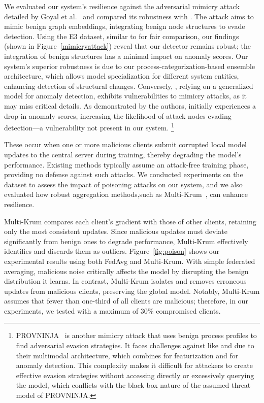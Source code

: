   We evaluated our system's resilience against the adversarial mimicry attack detailed by Goyal et al.~\cite{goyal2023sometimes} and compared its robustness with \flash. The attack aims to mimic benign graph embeddings, integrating benign node structures to evade detection. Using the E3 dataset, similar to \flash for fair comparison, our findings (shown in Figure~\ref{mimicryattack}) reveal that our detector remains robust; the integration of benign structures has a minimal impact on anomaly scores. Our system's superior robustness is due to our process-categorization-based ensemble \gnnshort architecture, which allows model specialization for different system entities, enhancing detection of structural changes. Conversely, \flash, relying on a generalized model for anomaly detection, exhibits vulnerabilities to mimicry attacks, as it may miss critical details. As demonstrated by the authors, \flash initially experiences a drop in anomaly scores, increasing the likelihood of attack nodes evading detection—a vulnerability not present in our system. \footnote{PROVNINJA~\cite{mukherjee2023evading} is another mimicry attack that uses benign process profiles to find adversarial evasion strategies. It faces challenges against \pids like \flash and \Sys due to their multimodal architecture, which combines \wordvec for featurization and \gnnshort for anomaly detection. This complexity makes it difficult for attackers to create effective evasion strategies without accessing \wordvec directly or excessively querying the model, which conflicts with the black box nature of the assumed threat model of PROVNINJA.}


 These occur when one or more malicious clients submit corrupted local model updates to the central server during training, thereby degrading the model’s performance. Existing methods typically assume an attack-free training phase, providing no defense against such attacks. We conducted experiments on the \optc dataset to assess the impact of poisoning attacks on our system, and we also evaluated how robust aggregation methods,such as Multi-Krum~\cite{munoz2019byzantine}, can enhance resilience.

Multi-Krum compares each client’s gradient with those of other clients, retaining only the most consistent updates. Since malicious updates must deviate significantly from benign ones to degrade performance, Multi-Krum effectively identifies and discards them as outliers. Figure~\ref{fig:poison} shows our experimental results using both FedAvg and Multi-Krum. With simple federated averaging, malicious noise critically affects the model by disrupting the benign distribution it learns. In contrast, Multi-Krum isolates and removes erroneous updates from malicious clients, preserving the global model. Notably, Multi-Krum assumes that fewer than one-third of all clients are malicious; therefore, in our experiments, we tested with a maximum of 30\% compromised clients.



